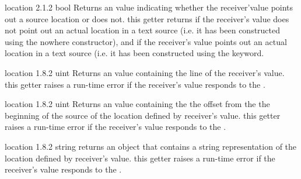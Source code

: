 {location}
{2.1.2}
{bool}
{Returns an  value indicating whether the receiver'value points out a source location or does not.}
{this getter returns  if the receiver's value does not point out an actual location in a text source (i.e. it has been constructed using the nowhere constructor), and  if the receiver's value points out an actual location in a text source (i.e. it has been constructed using the  keyword.}


{location}
{1.8.2}
{uint}
{Returns an  value containing the line of the receiver's value.}
{this getter raises a run-time error if the receiver's value responds  to the .}


{location}
{1.8.2}
{uint}
{Returns an  value containing the the offset from the the beginning of the source of the location defined by receiver's value.}
{this getter raises a run-time error if the receiver's value responds  to the .}


{location}
{1.8.2}
{string}
{returns an  object that contains a string representation of the location defined by receiver's value.}
{this getter raises a run-time error if the receiver's value responds  to the .}
